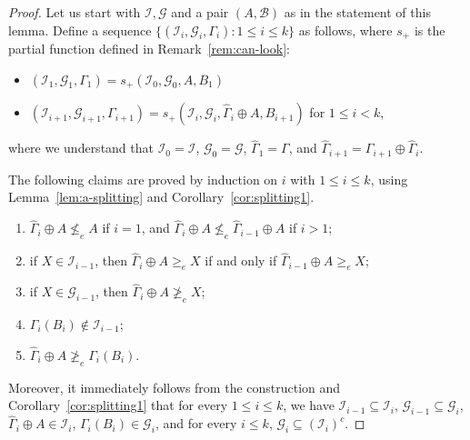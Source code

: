\documentclass[11pt]{amsart}
\begin{document}
\begin{proof}
Let us start with $\mathcal{I},\mathcal{G}$ and a pair $(A, \mathcal{B})$ as 
in the statement of this lemma. Define a sequence 
$\{(\mathcal{I}_i, \mathcal{G}_i, \Gamma_i): 1 \leq i \leq k\}$ as follows, 
where $s_+$ is the partial function defined in Remark~\ref{rem:can-look}:
\begin{itemize}
  \item $(\mathcal{I}_1, \mathcal{G}_1, \Gamma_1) = 
      s_+(\mathcal{I}_0,\mathcal{G}_0, A, B_1)$ 
      
  \item $(\mathcal{I}_{i+1}, \mathcal{G}_{i+1}, \Gamma_{i+1}) = 
      s_+(\mathcal{I}_i, \mathcal{G}_i, \hat{\Gamma}_i \oplus A, B_{i+1})$ 
      for $1 \leq i < k$,
\end{itemize}

where we understand that $\mathcal{I}_0=\mathcal{I}$, 
$\mathcal{G}_0=\mathcal{G}$,  $\hat{\Gamma}_1 = \Gamma$, and 
$\hat{\Gamma}_{i+1}=\Gamma_{i+1}\oplus \hat{\Gamma}_i$. 

The following claims are proved by induction on $i$ with $1 \le i \leq k$, 
using Lemma~\ref{lem:a-splitting} and Corollary~\ref{cor:splitting1}. 

\begin{enumerate}
  \item[(0)] $\hat{\Gamma}_i \oplus A \nleq_e A$ if $i=1$, and 
      $\hat{\Gamma}_i \oplus A \nleq_e \hat{\Gamma}_{i-1} \oplus A$ if 
      $i>1$; 
      
  \item if $X \in \mathcal{I}_{i-1}$, then $\hat{\Gamma}_i \oplus A \geq_e 
      X$ if and only if $\hat{\Gamma}_{i-1} \oplus A \geq_e X$; 
      
  \item if $X \in \mathcal{G}_{i-1}$, then $\hat{\Gamma}_i \oplus A \ngeq_e 
      X$; 
  
  \item $\Gamma_i(B_i) \notin \mathcal{I}_{i-1}$;
  
  \item $\hat{\Gamma}_i \oplus A \ngeq_e \Gamma_i(B_i)$.
\end{enumerate}

Moreover, it immediately follows from the construction and 
Corollary~\ref{cor:splitting1} that for every $1\leq i \leq k$, we have 
$\mathcal{I}_{i-1} \subseteq \mathcal{I}_{i}$, $\mathcal{G}_{i-1} \subseteq 
\mathcal{G}_{i}$, $\hat{\Gamma}_i \oplus A \in \mathcal{I}_i$,
$\Gamma_i(B_i) \in \mathcal{G}_i$, and for every $i \leq 
k$, $\mathcal{G}_{i} \subseteq (\mathcal{I}_i)^c$. 


\end{proof}
\end{document}
